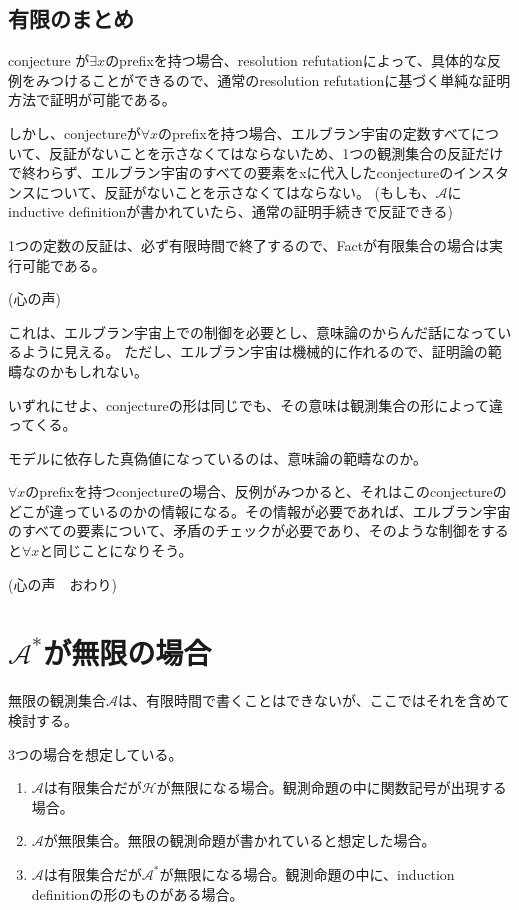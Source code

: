 \documentclass[10pt, oneside]{jarticle}   	%
\theoremstyle{definition}
\newcommand{\clos}[1]{\mathcal{#1}^{*}}
\begin{document}
\subsection{有限のまとめ}
conjecture が$\exists x $のprefixを持つ場合、resolution refutationによって、具体的な反例をみつけることができるので、通常のresolution refutationに基づく単純な証明方法で証明が可能である。

しかし、conjectureが$\forall x$のprefixを持つ場合、エルブラン宇宙の定数すべてについて、反証がないことを示さなくてはならないため、1つの観測集合の反証だけで終わらず、エルブラン宇宙のすべての要素をxに代入したconjectureのインスタンスについて、反証がないことを示さなくてはならない。
(もしも、$\mathcal{A}$にinductive definitionが書かれていたら、通常の証明手続きで反証できる)

1つの定数の反証は、必ず有限時間で終了するので、Factが有限集合の場合は実行可能である。

(心の声)

これは、エルブラン宇宙上での制御を必要とし、意味論のからんだ話になっているように見える。
ただし、エルブラン宇宙は機械的に作れるので、証明論の範疇なのかもしれない。

いずれにせよ、conjectureの形は同じでも、その意味は観測集合の形によって違ってくる。

モデルに依存した真偽値になっているのは、意味論の範疇なのか。

$\forall x$のprefixを持つconjectureの場合、反例がみつかると、それはこのconjectureのどこが違っているのかの情報になる。その情報が必要であれば、エルブラン宇宙のすべての要素について、矛盾のチェックが必要であり、そのような制御をすると$\forall x$と同じことになりそう。

(心の声　おわり)


\newpage

\section{$\clos{A}$が無限の場合}

無限の観測集合$\mathcal{A}$は、有限時間で書くことはできないが、ここではそれを含めて検討する。

3つの場合を想定している。
\begin{enumerate}
\item $\mathcal{A}$は有限集合だが$\mathcal{H}$が無限になる場合。観測命題の中に関数記号が出現する場合。
\item $\mathcal{A}$が無限集合。無限の観測命題が書かれていると想定した場合。
\item $\mathcal{A}$は有限集合だが$\clos{A}$が無限になる場合。観測命題の中に、induction definitionの形のものがある場合。
\end{enumerate}
\end{document}
